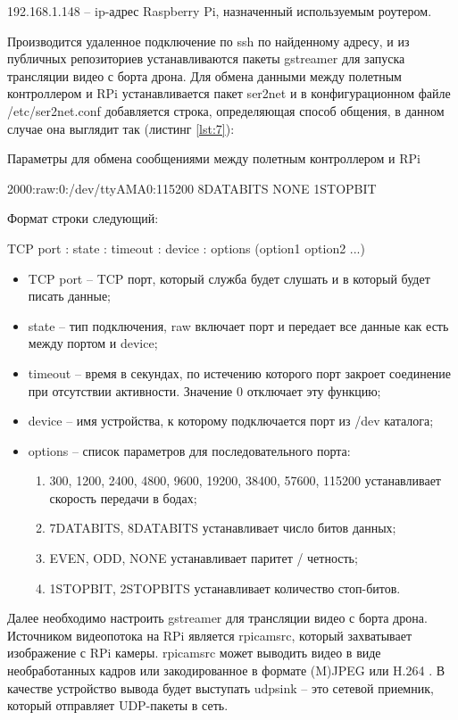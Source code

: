 192.168.1.148 -- ip-адрес Raspberry Pi, назначенный используемым роутером.

Производится удаленное подключение по ssh по найденному адресу, и из публичных репозиториев устанавливаются пакеты gstreamer для запуска трансляции видео с борта дрона.
Для обмена данными между полетным контроллером и RPi устанавливается пакет ser2net и в конфигурационном файле /etc/ser2net.conf добавляется строка, определяющая способ общения, в данном случае она выглядит так (листинг \ref{lst:7}):
\begin{Program}[H]
\caption{Параметры для обмена сообщениями между полетным контроллером и RPi} \label{lst:7}
	\begin{MyCode}
	2000:raw:0:/dev/ttyAMA0:115200 8DATABITS NONE 1STOPBIT
	\end{MyCode}
\end{Program}
Формат строки следующий:

TCP port : state : timeout : device : options (option1 option2 ...)

\begin{itemize}
	\item TCP port -- TCP порт, который служба будет слушать и в который будет писать данные;
	\item state -- тип подключения, raw включает порт и передает все данные как есть между портом и device;
	\item timeout -- время в секундах, по истечению которого порт закроет соединение при отсутствии активности. Значение 0 отключает эту функцию;
	\item device -- имя устройства, к которому подключается порт из /dev каталога;
	\item options -- список параметров для последовательного порта:
	\begin{enumerate}
		 \item 300, 1200, 2400, 4800, 9600, 19200, 38400, 57600, 115200 устанавливает скорость передачи в бодах;
		\item 7DATABITS, 8DATABITS устанавливает число битов данных;
		\item EVEN, ODD, NONE устанавливает паритет / четность;
		\item 1STOPBIT, 2STOPBITS устанавливает количество стоп-битов.
	\end{enumerate}
\end{itemize}

Далее необходимо настроить gstreamer для трансляции видео с борта дрона. Источником видеопотока на RPi является rpi\-cam\-src, который захватывает изображение с RPi камеры. rpi\-cam\-src может выводить видео в виде необработанных кадров или закодированное в формате (M)JPEG или H.264 \cite{gstreamer1}. В качестве устройство вывода будет выступать  udpsink -- это сетевой приемник, который отправляет UDP-пакеты в сеть.

